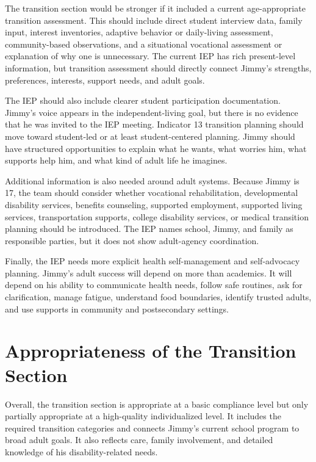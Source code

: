 The transition section would be stronger if it included a current age-appropriate transition assessment. This should include direct student interview data, family input, interest inventories, adaptive behavior or daily-living assessment, community-based observations, and a situational vocational assessment or explanation of why one is unnecessary. The current IEP has rich present-level information, but transition assessment should directly connect Jimmy's strengths, preferences, interests, support needs, and adult goals.

The IEP should also include clearer student participation documentation. Jimmy's voice appears in the independent-living goal, but there is no evidence that he was invited to the IEP meeting. Indicator 13 transition planning should move toward student-led or at least student-centered planning. Jimmy should have structured opportunities to explain what he wants, what worries him, what supports help him, and what kind of adult life he imagines.

Additional information is also needed around adult systems. Because Jimmy is 17, the team should consider whether vocational rehabilitation, developmental disability services, benefits counseling, supported employment, supported living services, transportation supports, college disability services, or medical transition planning should be introduced. The IEP names school, Jimmy, and family as responsible parties, but it does not show adult-agency coordination.

Finally, the IEP needs more explicit health self-management and self-advocacy planning. Jimmy's adult success will depend on more than academics. It will depend on his ability to communicate health needs, follow safe routines, ask for clarification, manage fatigue, understand food boundaries, identify trusted adults, and use supports in community and postsecondary settings.

\section*{Appropriateness of the Transition Section}

Overall, the transition section is appropriate at a basic compliance level but only partially appropriate at a high-quality individualized level. It includes the required transition categories and connects Jimmy's current school program to broad adult goals. It also reflects care, family involvement, and detailed knowledge of his disability-related needs.

